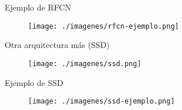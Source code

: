 \documentclass[presentation, t]{beamer}
\begin{document}
\begin{frame}[label={sec:org2a9f368}]{Ejemplo de RFCN}
\vfill

\begin{figure}[htbp]
\centering
\texttt{[image: ./imagenes/rfcn-ejemplo.png]}
\end{figure}\vfill
\end{frame}

\begin{frame}[label={sec:orgc71bec6}]{Otra arquitectura más (SSD)}
\vfill

\begin{figure}[htbp]
\centering
\texttt{[image: ./imagenes/ssd.png]}
\end{figure}\vfill
\end{frame}

\begin{frame}[label={sec:orgcb77c59}]{Ejemplo de SSD}
\vfill

\begin{figure}[htbp]
\centering
\texttt{[image: ./imagenes/ssd-ejemplo.png]}
\end{figure}\vfill
\end{frame}
\end{document}
